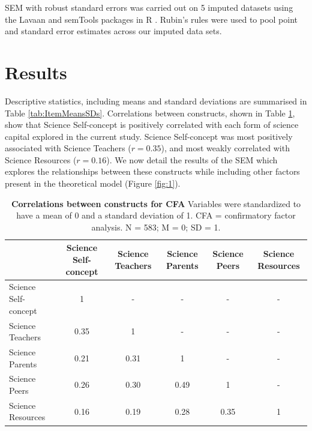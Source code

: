 SEM with robust standard errors \cite{huber1967behavior,white1982maximum} was carried out on 5 imputed datasets using the Lavaan \cite{rosseel2012lavaan} and semTools \cite{jorgensen2018package} packages in R \cite{team2013r}. Rubin's rules \cite{rubin2004multiple} were used to pool point and standard error estimates across our imputed data sets. 


\section*{Results}
\label{results}
Descriptive statistics, including means and standard deviations are summarised in Table \ref{tab:ItemMeansSDs}. Correlations between constructs, shown in Table \ref{tab:Correlations}, show that Science Self-concept is positively correlated with each form of science capital explored in the current study. Science Self-concept was most positively associated with Science Teachers ($r = 0.35$), and most weakly correlated with Science Resources ($r = 0.16$). We now detail the results of the SEM which explores the relationships between these constructs while including other factors present in the theoretical model (Figure \ref{fig:1}).

\begin{table}[ht]
\label{tab:Correlations}       %
\begin{tabular}{lccccc}
\cline{2-6}
                  & Science Self-concept & Science Teachers & Science Parents & Science Peers & Science Resources \\ \hline
Science Self-concept  & 1                & -                & -               & -             & -                 \\
Science Teachers  & 0.35            & 1                & -               & -             & -                 \\
Science Parents   & 0.21            & 0.31            & 1               & -             & -                 \\
Science Peers     & 0.26            & 0.30            & 0.49            & 1             & -                 \\
Science Resources & 0.16            & 0.19            & 0.28           & 0.35         & 1                 \\ \hline
\end{tabular}
\caption{\textbf{Correlations between constructs for CFA}  Variables were standardized to have a mean of 0 and a standard deviation of 1. CFA =
confirmatory factor analysis. N = 583; M = 0; SD = 1.}
\end{table}

